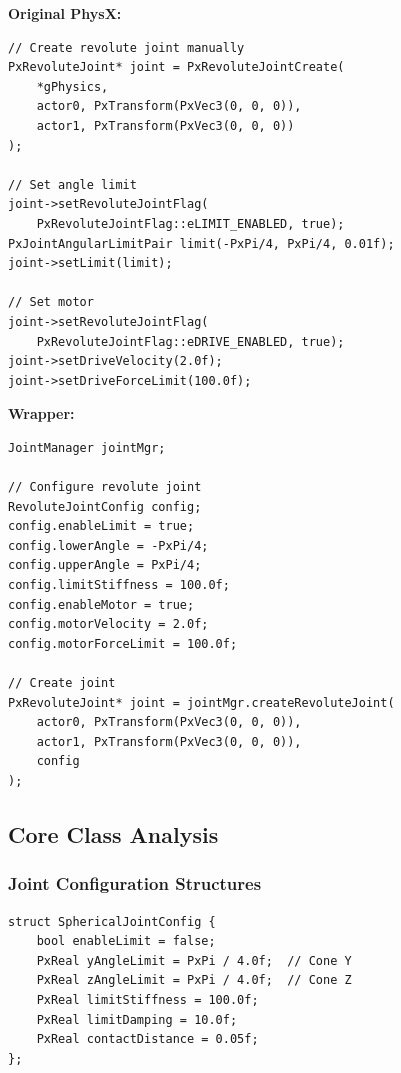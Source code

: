 \textbf{Original PhysX:}
\begin{lstlisting}[caption={Direct joint creation}]
// Create revolute joint manually
PxRevoluteJoint* joint = PxRevoluteJointCreate(
    *gPhysics,
    actor0, PxTransform(PxVec3(0, 0, 0)),
    actor1, PxTransform(PxVec3(0, 0, 0))
);

// Set angle limit
joint->setRevoluteJointFlag(
    PxRevoluteJointFlag::eLIMIT_ENABLED, true);
PxJointAngularLimitPair limit(-PxPi/4, PxPi/4, 0.01f);
joint->setLimit(limit);

// Set motor
joint->setRevoluteJointFlag(
    PxRevoluteJointFlag::eDRIVE_ENABLED, true);
joint->setDriveVelocity(2.0f);
joint->setDriveForceLimit(100.0f);
\end{lstlisting}

\textbf{Wrapper:}
\begin{lstlisting}[caption={Config-driven joint creation}]
JointManager jointMgr;

// Configure revolute joint
RevoluteJointConfig config;
config.enableLimit = true;
config.lowerAngle = -PxPi/4;
config.upperAngle = PxPi/4;
config.limitStiffness = 100.0f;
config.enableMotor = true;
config.motorVelocity = 2.0f;
config.motorForceLimit = 100.0f;

// Create joint
PxRevoluteJoint* joint = jointMgr.createRevoluteJoint(
    actor0, PxTransform(PxVec3(0, 0, 0)),
    actor1, PxTransform(PxVec3(0, 0, 0)),
    config
);
\end{lstlisting}


\subsection{Core Class Analysis}

\subsubsection{Joint Configuration Structures}

\begin{lstlisting}[caption={Spherical joint config}]
struct SphericalJointConfig {
    bool enableLimit = false;
    PxReal yAngleLimit = PxPi / 4.0f;  // Cone Y
    PxReal zAngleLimit = PxPi / 4.0f;  // Cone Z
    PxReal limitStiffness = 100.0f;
    PxReal limitDamping = 10.0f;
    PxReal contactDistance = 0.05f;
};
\end{lstlisting}

